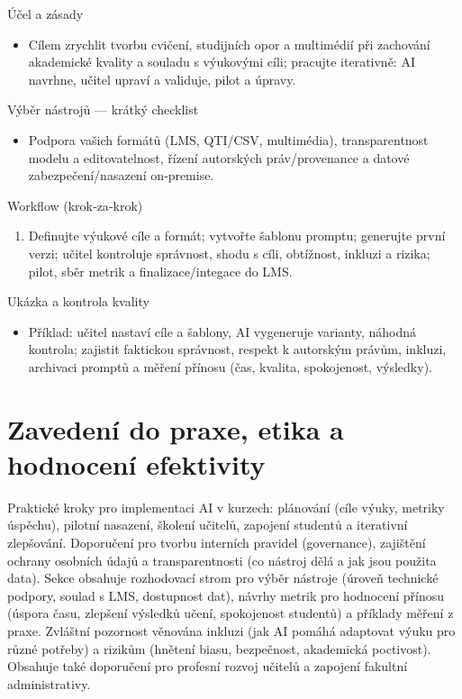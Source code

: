 \documentclass{report}%
\begin{document}
%
Účel a zásady
\begin{itemize}\item Cílem zrychlit tvorbu cvičení, studijních opor a multimédií při zachování akademické kvality a souladu s výukovými cíli; pracujte iterativně: AI navrhne, učitel upraví a validuje, pilot a úpravy.\end{itemize}
Výběr nástrojů — krátký checklist
\begin{itemize}\item Podpora vašich formátů (LMS, QTI/CSV, multimédia), transparentnost modelu a editovatelnost, řízení autorských práv/provenance a datové zabezpečení/nasazení on‑premise.\end{itemize}
Workflow (krok‑za‑krok)
\begin{enumerate}\item Definujte výukové cíle a formát; vytvořte šablonu promptu; generujte první verzi; učitel kontroluje správnost, shodu s cíli, obtížnost, inkluzi a rizika; pilot, sběr metrik a finalizace/integace do LMS.\end{enumerate}
Ukázka a kontrola kvality
\begin{itemize}\item Příklad: učitel nastaví cíle a šablony, AI vygeneruje varianty, náhodná kontrola; zajistit faktickou správnost, respekt k autorským právům, inkluzi, archivaci promptů a měření přínosu (čas, kvalita, spokojenost, výsledky).\end{itemize}%

%
\chapter{Zavedení do praxe, etika a hodnocení efektivity}%
Praktické kroky pro implementaci AI v kurzech: plánování (cíle výuky, metriky úspěchu), pilotní nasazení, školení učitelů, zapojení studentů a iterativní zlepšování. Doporučení pro tvorbu interních pravidel (governance), zajištění ochrany osobních údajů a transparentnosti (co nástroj dělá a jak jsou použita data). Sekce obsahuje rozhodovací strom pro výběr nástroje (úroveň technické podpory, soulad s LMS, dostupnost dat), návrhy metrik pro hodnocení přínosu (úspora času, zlepšení výsledků učení, spokojenost studentů) a příklady měření z praxe. Zvláštní pozornost věnována inkluzi (jak AI pomáhá adaptovat výuku pro různé potřeby) a rizikům (hnětení biasu, bezpečnost, akademická poctivost). Obsahuje také doporučení pro profesní rozvoj učitelů a zapojení fakultní administrativy.%
\end{document}
